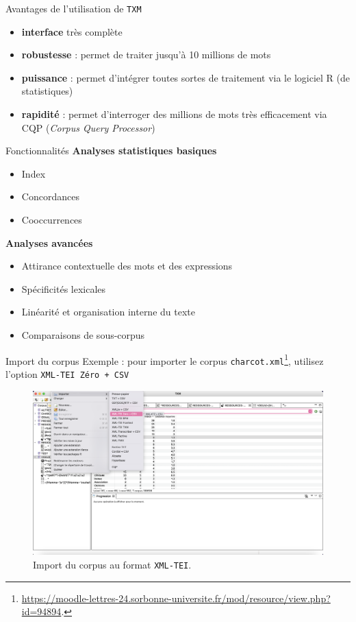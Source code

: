 \documentclass[xetex,xcolor={table,usenames,dvipsnames}]{beamer}
\newcommand{\bolder}[1]{{\color{purple}\bfseries#1}}
\begin{document}
\begin{frame}{Avantages de l'utilisation de \texttt{TXM}}
	\begin{itemize}
		\item \textbf{interface} très complète
		\item \textbf{robustesse} : permet de traiter jusqu'à 10 millions de mots
		\item \textbf{puissance} : permet d'intégrer toutes sortes de traitement via le logiciel \textsc{R} (de
		statistiques)
		\item \textbf{rapidité} : permet d'interroger des millions de mots très eﬃcacement via \textsc{CQP}
		(\textit{Corpus Query Processor})
	\end{itemize}
	\begin{flushright}
		{\small\citep{fort}}
	\end{flushright}
	
\end{frame}
\begin{frame}{Fonctionnalités}
	\bolder{Analyses statistiques basiques}
	\begin{itemize}
		\item Index
		\item Concordances
		\item Cooccurrences
	\end{itemize}
	\bolder{Analyses avancées}
		\begin{itemize}
		\item Attirance contextuelle des mots et des expressions
		\item Spécificités lexicales
		\item Linéarité et organisation interne du texte
		\item Comparaisons de sous-corpus
	\end{itemize}
	

\end{frame}

\begin{frame}{Import du corpus}
	Exemple : pour importer le corpus \texttt{charcot.xml}\footnote{\url{https://moodle-lettres-24.sorbonne-universite.fr/mod/resource/view.php?id=94894}.}, utilisez l'option \texttt{XML-TEI Zéro + CSV}
		\begin{figure}[h] %
		\centering
		\includegraphics[width=0.75\linewidth]{img/import_charcot.png}
		\caption{Import du corpus au format \texttt{XML-TEI}.}
		\label{fig:ling_out_TAL}
	\end{figure}
\end{frame}
\end{document}
